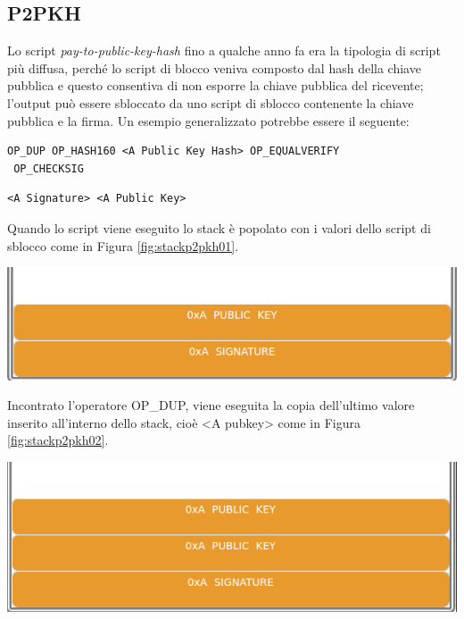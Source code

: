 

\subsection{P2PKH}
Lo script {\it pay-to-public-key-hash \/} fino a qualche anno fa era la tipologia di script più diffusa, perché lo script di blocco veniva composto dal hash della chiave pubblica e questo consentiva di non esporre la chiave pubblica del ricevente; l’output può essere sbloccato da uno script di sblocco contenente la chiave pubblica e la firma. Un esempio generalizzato potrebbe essere il seguente:

\begin{lstlisting}[language=bitcoinscript, caption={P2PKH Script di blocco.}]
 OP_DUP OP_HASH160 <A Public Key Hash> OP_EQUALVERIFY
 OP_CHECKSIG
\end{lstlisting}

\begin{lstlisting}[language=bitcoinscript, caption={P2PKH Script di sblocco.}]
<A Signature> <A Public Key>
\end{lstlisting}



Quando lo script viene eseguito lo stack è popolato con i valori dello script di sblocco come in Figura \ref{fig:stackp2pkh01}.

{\centering
\vspace{15pt}
\includegraphics[scale=0.35]{images/script/p2pkh/1.png}
\vspace{10pt}
\par}


Incontrato l’operatore OP\_DUP, viene eseguita la copia dell’ultimo valore inserito all’interno dello stack, cioè <A pubkey> come in Figura \ref{fig:stackp2pkh02}.
{\centering
\vspace{15pt}
\includegraphics[scale=0.35]{images/script/p2pkh/2.png}
\vspace{10pt}
\par}


